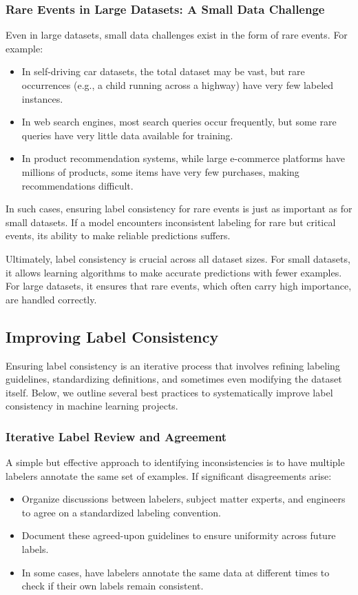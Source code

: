 \documentclass[12pt,openany]{book}
\begin{document}
\subsubsection{Rare Events in Large Datasets: A Small Data Challenge}
Even in large datasets, small data challenges exist in the form of rare events. For example:
\begin{itemize}
    \item In self-driving car datasets, the total dataset may be vast, but rare occurrences (e.g., a child running across a highway) have very few labeled instances.
    \item In web search engines, most search queries occur frequently, but some rare queries have very little data available for training.
    \item In product recommendation systems, while large e-commerce platforms have millions of products, some items have very few purchases, making recommendations difficult.
\end{itemize}

In such cases, ensuring label consistency for rare events is just as important as for small datasets. If a model encounters inconsistent labeling for rare but critical events, its ability to make reliable predictions suffers. \newline

Ultimately, label consistency is crucial across all dataset sizes. For small datasets, it allows learning algorithms to make accurate predictions with fewer examples. For large datasets, it ensures that rare events, which often carry high importance, are handled correctly.

\subsection{Improving Label Consistency}

Ensuring label consistency is an iterative process that involves refining labeling guidelines, standardizing definitions, and sometimes even modifying the dataset itself. Below, we outline several best practices to systematically improve label consistency in machine learning projects.

\subsubsection{Iterative Label Review and Agreement}
A simple but effective approach to identifying inconsistencies is to have multiple labelers annotate the same set of examples. If significant disagreements arise:
\begin{itemize}
    \item Organize discussions between labelers, subject matter experts, and engineers to agree on a standardized labeling convention.
    \item Document these agreed-upon guidelines to ensure uniformity across future labels.
    \item In some cases, have labelers annotate the same data at different times to check if their own labels remain consistent.
\end{itemize}
\end{document}
